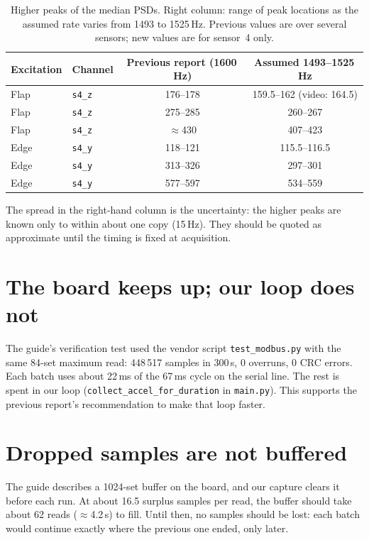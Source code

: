 \documentclass[11pt]{article}
\newcommand{\code}[1]{\texttt{#1}}
\begin{document}
\begin{table}[h]
  \centering
  \begin{tabular}{llcc}
    \toprule
    Excitation & Channel & Previous report (1600\,Hz) & Assumed 1493--1525\,Hz \\
    \midrule
    Flap & \code{s4\_z} & 176--178 & 159.5--162 \quad(video: 164.5) \\
    Flap & \code{s4\_z} & 275--285 & 260--267 \\
    Flap & \code{s4\_z} & $\approx$430 & 407--423 \\
    Edge & \code{s4\_y} & 118--121 & 115.5--116.5 \\
    Edge & \code{s4\_y} & 313--326 & 297--301 \\
    Edge & \code{s4\_y} & 577--597 & 534--559 \\
    \bottomrule
  \end{tabular}
  \caption{Higher peaks of the median PSDs. Right column: range of peak
  locations as the assumed rate varies from 1493 to 1525\,Hz. Previous
  values are over several sensors; new values are for sensor~4 only.}
  \label{tab:peaks}
\end{table}

The spread in the right-hand column is the uncertainty: the higher peaks are
known only to within about one copy (15\,Hz). They should be quoted as
approximate until the timing is fixed at acquisition.

\section{The board keeps up; our loop does not}

The guide's verification test used the vendor script \code{test\_modbus.py}
with the same 84-set maximum read: 448\,517 samples in 300\,s, 0 overruns,
0 CRC errors. Each batch uses about 22\,ms of the 67\,ms cycle on the serial
line. The rest is spent in our loop (\code{collect\_accel\_for\_duration} in
\code{main.py}). This supports the previous report's recommendation to make
that loop faster.

\section{Dropped samples are not buffered}

The guide describes a 1024-set buffer on the board, and our capture clears
it before each run. At about 16.5 surplus samples per read, the buffer
should take about 62 reads ($\approx$4.2\,s) to fill. Until then, no samples
should be lost: each batch would continue exactly where the previous one
ended, only later.
\end{document}
